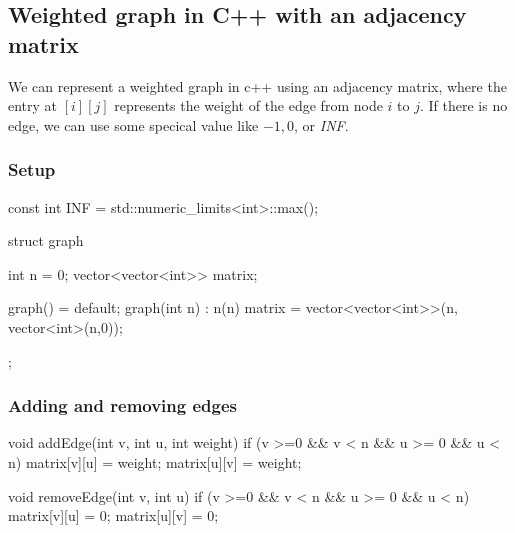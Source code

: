 \documentclass{report}
\begin{document}
\pagebreak 
\subsection{Weighted graph in C++ with an adjacency matrix}
\bigbreak \noindent 
We can represent a weighted graph in c++ using an adjacency matrix, where the entry at $[i][j]$ represents the weight of the edge from node $i$ to $j$. If there is no edge, we can use some specical value like $-1,0$, or \textit{INF}.
\bigbreak \noindent 
\subsubsection{Setup}
\bigbreak \noindent 
\begin{cppcode}
const int INF = std::numeric_limits<int>::max();

struct graph {
    int n = 0;
    vector<vector<int>> matrix;

    graph() = default;
    graph(int n) : n(n) {
        matrix = vector<vector<int>>(n, vector<int>(n,0));
    }
};
\end{cppcode}
\bigbreak \noindent 
\subsubsection{Adding and removing edges}
\bigbreak \noindent 
\begin{cppcode}
    void addEdge(int v, int u, int weight) {
        if (v >=0 && v < n && u >= 0 && u < n) {
            matrix[v][u] = weight;
            matrix[u][v] = weight;
        }
    }

    void removeEdge(int v, int u) {
        if (v >=0 && v < n && u >= 0 && u < n) {
            matrix[v][u] = 0;
            matrix[u][v] = 0;
        }
    }
\end{cppcode}

\pagebreak 
\end{document}
